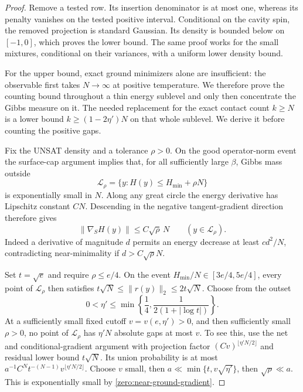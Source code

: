 \documentclass[11pt,a4paper]{article}
\numberwithin{equation}{section}
\theoremstyle{definition}
\theoremstyle{remark}
\begin{document}
\begin{proof}
Remove a tested row.  Its insertion denominator is at most one,
whereas its penalty vanishes on the tested positive interval.
Conditional on the cavity spin, the removed projection is standard
Gaussian.  Its density is bounded below on \([-1,0]\), which proves
the lower bound.  The same proof works for the small mixtures,
conditional on their variances, with a uniform lower density bound.

For the upper bound, exact ground minimizers alone are insufficient:
the observable first takes $N\to\infty$ at positive temperature.
We therefore prove the counting bound throughout a thin energy sublevel
and only then concentrate the Gibbs measure on it.  The needed
replacement for the exact contact count $k\ge N$ is a lower bound
$k\ge(1-2\eta')N$ on that whole sublevel.  We derive it before counting
the positive gaps.

Fix the UNSAT density and a tolerance \(\rho>0\).  On the good operator-norm
event the surface-cap argument implies that, for all sufficiently
large \(\beta\), Gibbs mass outside
\[
 \mathcal L_\rho=\{y:H(y)\le H_{\min}+\rho N\}
\]
is exponentially small in \(N\).  Along any great circle the energy
derivative has Lipschitz constant \(CN\).  Descending in the negative
tangent-gradient direction therefore gives
\begin{equation}\label{zero:near-ground-gradient}
 \|\nabla_S H(y)\|\le C\sqrt\rho\,N
 \qquad(y\in\mathcal L_\rho).
\end{equation}
Indeed a derivative of magnitude \(d\) permits an energy decrease
at least \(c d^2/N\), contradicting near-minimality if
\(d>C\sqrt\rho N\).

Set $t=\sqrt e$ and require $\rho\le e/4$.
On the event $H_{\min}/N\in[3e/4,5e/4]$, every point of
$\mathcal L_\rho$ then satisfies
$t\sqrt N\le\|r(y)\|_2\le2t\sqrt N$.  Choose from the outset
\[
 0<\eta'\le\min\left\{\frac14,
                   \frac1{2(1+|\log t|)}\right\}.
\]
At a sufficiently small fixed cutoff \(v=v(e,\eta')>0\), and then sufficiently small
\(\rho>0\), no point of \(\mathcal L_\rho\) has \(\eta'N\) absolute
gaps at most \(v\).  To see this, use the net and conditional-gradient
argument with projection factor \((Cv)^{\lfloor\eta'N/2\rfloor}\)
and residual lower bound \(t\sqrt N\).  Its union probability is
at most \(a^{-1}C^N t^{-(N-1)}v^{\lfloor\eta'N/2\rfloor}\).
Choose \(v\) small, then \(a\ll\min\{t,v\sqrt{\eta'}\}\), then
\(\sqrt\rho\ll a\).  This is exponentially small by
\eqref{zero:near-ground-gradient}.


\end{proof}
\end{document}
